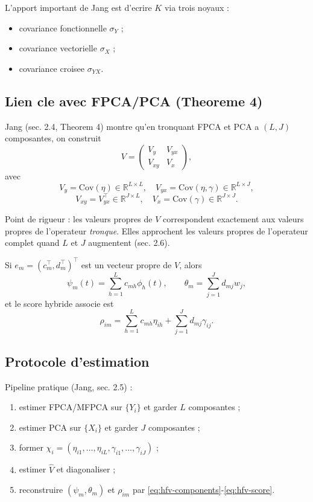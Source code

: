 \documentclass[11pt,a4paper]{article}
\begin{document}
L'apport important de Jang est d'ecrire $K$ via trois noyaux :
\begin{itemize}[leftmargin=1.5em]
  \item covariance fonctionnelle $\sigma_Y$ ;
  \item covariance vectorielle $\sigma_X$ ;
  \item covariance croisee $\sigma_{YX}$.
\end{itemize}

\subsection{Lien cle avec FPCA/PCA (Theoreme 4)}

Jang (sec. 2.4, Theorem 4) montre qu'en tronquant FPCA et PCA a $(L,J)$
composantes, on construit
\begin{equation}
V=
\begin{pmatrix}
V_y & V_{yx}\\
V_{xy} & V_x
\end{pmatrix},
\label{eq:hfv-block}
\end{equation}
avec
\[
V_y=\mathrm{Cov}(\eta)\in\mathbb{R}^{L\times L},\quad
V_{yx}=\mathrm{Cov}(\eta,\gamma)\in\mathbb{R}^{L\times J},
\]
\[
V_{xy}=V_{yx}^\top\in\mathbb{R}^{J\times L},\quad
V_x=\mathrm{Cov}(\gamma)\in\mathbb{R}^{J\times J}.
\]

Point de rigueur : les valeurs propres de $V$ correspondent exactement aux
valeurs propres de l'operateur \emph{tronque}. Elles approchent les valeurs
propres de l'operateur complet quand $L$ et $J$ augmentent (sec. 2.6).

Si $e_m=(c_m^\top,d_m^\top)^\top$ est un vecteur propre de $V$, alors
\begin{equation}
\psi_m(t)=\sum_{h=1}^L c_{mh}\phi_h(t),\qquad
\theta_m=\sum_{j=1}^J d_{mj}w_j,
\label{eq:hfv-components}
\end{equation}
et le score hybride associe est
\begin{equation}
\rho_{im}=\sum_{h=1}^L c_{mh}\eta_{ih}+\sum_{j=1}^J d_{mj}\gamma_{ij}.
\label{eq:hfv-score}
\end{equation}

\subsection{Protocole d'estimation}

Pipeline pratique (Jang, sec. 2.5) :
\begin{enumerate}[leftmargin=1.5em]
  \item estimer FPCA/MFPCA sur $\{Y_i\}$ et garder $L$ composantes ;
  \item estimer PCA sur $\{X_i\}$ et garder $J$ composantes ;
  \item former $\chi_i=(\eta_{i1},\dots,\eta_{iL},\gamma_{i1},\dots,\gamma_{iJ})$ ;
  \item estimer $\widehat{V}$ et diagonaliser ;
  \item reconstruire $(\psi_m,\theta_m)$ et $\rho_{im}$ par
  \eqref{eq:hfv-components}-\eqref{eq:hfv-score}.
\end{enumerate}
\end{document}
